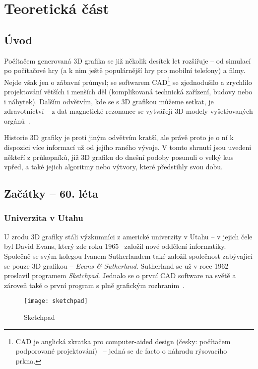 \documentclass[a4paper, 11pt]{report}
\begin{document}
\part{Teoretická část}
\begin{chapterwithoutpagebreak}
\chapter{Úvod}
Počítačem generovaná 3D grafika se již několik desítek let rozšiřuje -- od simulací po počítačové hry (a k nim ještě populárnější hry pro mobilní telefony) a filmy. Nejde však jen o zábavní průmysl; se softwarem CAD\footnote{CAD je anglická zkratka pro computer-aided design (česky: počítačem podporované projektování)~\cite{wiki:cad} -- jedná se de facto o náhradu rýsovacího prkna.} se zjednodušilo a zrychlilo projektování větších i menších děl (komplikovaná technická zařízení, budovy nebo i nábytek). Dalším odvětvím, kde se s 3D grafikou můžeme setkat, je zdravotnictví -- z dat magnetické rezonance se vytvářejí 3D modely vyšetřovaných orgánů~\cite{myvmc:mri}.

Historie 3D grafiky je proti jiným odvětvím kratší, ale právě proto je o ní k dispozici více informací už od jejího raného vývoje. V tomto shrnutí jsou uvedeni někteří z průkopníků, již 3D grafiku do dnešní podoby posunuli o velký kus vpřed, a také jejich algoritmy nebo výtvory, které předstihly svou dobu.

\chapter{Začátky -- 60. léta}
\section{Univerzita v Utahu}
U zrodu 3D grafiky stáli výzkumníci z americké univerzity v Utahu -- v jejich čele byl David Evans, který zde roku 1965~\cite{ethw:evans} založil nové oddělení informatiky. Společně se svým kolegou Ivanem Sutherlandem také založil společnost zabývající se pouze 3D grafikou -- \emph{Evans \& Sutherland}. Sutherland se už v roce 1962 proslavil programem \emph{Sketchpad}. Jednalo se o první CAD software na světě a zároveň také o první program s plně grafickým rozhraním~\cite{ufo:history}.

\begin{figure}[H]
    \centering
    \texttt{[image: sketchpad]}
    \caption[Sketchpad]{Sketchpad~\cite{pic:sketchpad}}
\end{figure}


\end{chapterwithoutpagebreak}
\end{document}
